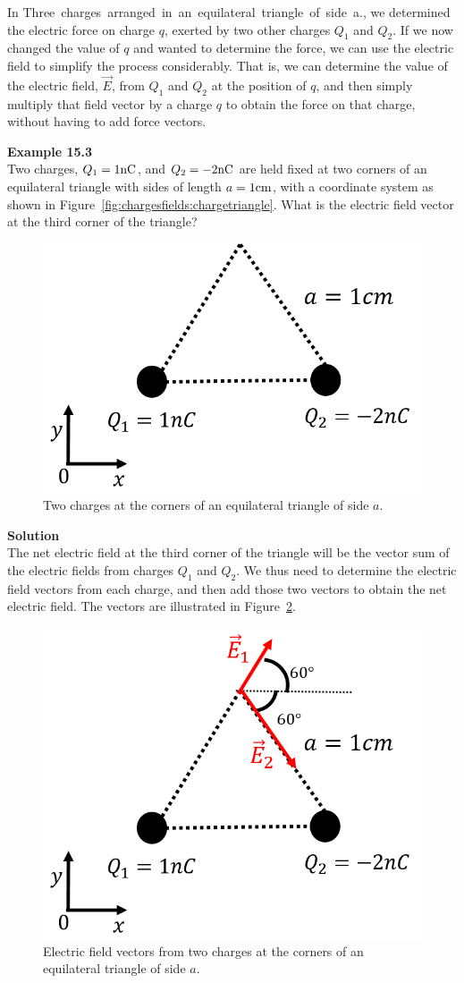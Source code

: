 In Three~charges~arranged~in~an~equilateral~triangle~of~side~a., we determined the electric force on charge $q$, exerted by two other charges $Q_1$ and $Q_2$. If we now changed the value of $q$ and wanted to determine the force, we can use the electric field to simplify the process considerably. That is, we can determine the value of the electric field, $\vec E$, from $Q_1$ and $Q_2$ at the position of $q$, and then simply multiply that field vector by a charge $q$ to obtain the force on that charge, without having to add force vectors.

\begin{framed}
\textbf{Example 15.3}\\
Two charges, $Q_1=1 {\rm nC}$, and $Q_2= -2 {\rm nC}$ are held fixed at two corners of an equilateral triangle with sides of length $a=1 {\rm cm}$, with a coordinate system as shown in Figure~\ref{fig:chargesfields:chargetriangle}. What is the electric field vector at the third corner of the triangle?

\begin{figure}[!htbp]
\centering
\includegraphics[width=0.4\linewidth]{files/fieldtriangle-c6a57a30ed4678046ce1a02cb4519207.png}
\caption[]{Two charges at the corners of an equilateral triangle of side $a$.}
\label{fig:chargesfields:fieldtriangle}
\end{figure}

\begin{framed}
\textbf{Solution}\\
The net electric field at the third corner of the triangle will be the vector sum of the electric fields from charges $Q_1$ and $Q_2$. We thus need to determine the electric field vectors from each charge, and then add those two vectors to obtain the net electric field. The vectors are illustrated in Figure~\ref{fig:chargesfields:fieldtriangle_sol}.

\begin{figure}[!htbp]
\centering
\includegraphics[width=0.4\linewidth]{files/fieldtriangle_sol-d6d26a9828e420c4da7572c93d22e5b3.png}
\caption[]{Electric field vectors from two charges at the corners of an equilateral triangle of side $a$.}
\label{fig:chargesfields:fieldtriangle_sol}
\end{figure}


\end{framed}
\end{framed}
